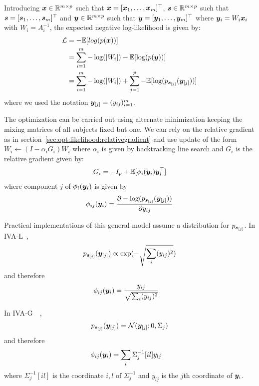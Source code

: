 Introducing $\xb \in \RR^{m \times p}$ such that $\xb  = [\xb_1, \dots, \xb_m]^{\top}$,
$\sbb \in \RR^{m \times p}$ such that $\sbb = [\sbb_1, \dots, \sbb_m]^{\top}$ and $\yb
\in \RR^{m \times p}$ such that $\yb = [\yb_1, \dots, \yb_m]^{\top}$ where $\yb_i = W_i
\xb_i$ with $W_i = A_i^{-1}$, the
expected negative log-likelihood is given by:
\begin{align*}
  \loss &= - \EE[log(p(\xb))] \\
        &= \sum_{i=1}^m -\log(|W_i|) -\EE[\log(p(\yb))] \\
        &= \sum_{i=1}^m - \log(|W_i|) + \sum_{j=1}^p -\EE[\log(p_{\sbb_{[j]}}(\yb_{[j]}))]
\end{align*}
where we used the notation $\yb_{[j]} = (y_{ij})_{i=1}^m$.

The optimization can be carried out using alternate minimization keeping the
mixing matrices of all subjects fixed but one. We can rely on the relative
gradient as in section~\ref{sec:opt:likelihood:relativegradient} and use update
of the form $W_i \leftarrow (I - \alpha_i G_i) W_i$ where $\alpha_i$ is given by
backtracking line search and $G_i$ is the relative gradient given by:
\begin{align}
  G_i = -I_p + \EE[\phi_i(\yb_i) \yb_i^{\top}]
\end{align}
where component $j$ of $\phi_i(\yb_i)$ is given by
\begin{align}
  \phi_{ij}(\yb_i) = \partialfrac{y_{ij}}{-\log(p_{\sbb_{[j]}}(\yb_{[j]}))}
\end{align}

Practical implementations of this general model assume a distribution for
$p_{\sbb_{[j]}}$.
In IVA-L~\cite{lee2008independent},
\begin{align}
  p_{\sbb_{[j]}}(\yb_{[j]}) \propto \exp(-\sqrt{\sum_i (y_{ij})^2})
\end{align}
and therefore
\begin{align}
  \phi_{ij}(\yb_i) &= \frac{y_{ij}}{\sqrt{\sum_i (y_{ij})^2}}
\end{align}

In IVA-G~\cite{anderson2011joint}~\cite{via2011maximum},
\begin{align}
  p_{\sbb_{[j]}}(\yb_{[j]}) = \Ncal( \yb_{[j]}; 0, \Sigma_j)
\end{align}
and therefore
\begin{align}
  \phi_{ij}(\yb_i) &= \sum_l \Sigma_j^{-1}[il] y_{lj}
\end{align}
where  $\Sigma_j^{-1}[il]$ is the coordinate $i, l$ of $\Sigma_j^{-1}$ and
$y_{lj}$ is the $j$th coordinate of $\yb_i$.

